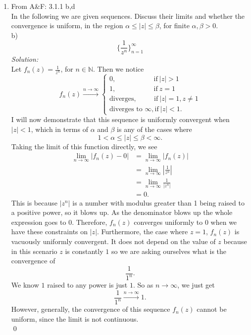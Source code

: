 \documentclass[10pt]{amsart}
\theoremstyle{nonumberplain}
\begin{document}
\begin{enumerate}[label={\bf {\arabic*}:}]
\item From A\&F: 3.1.1 b,d \\
In the following we are given sequences.
Discuss their limits and whether the convergence is uniform, in the region $\alpha \leq |z| \leq \beta$, for finite $\alpha, \beta > 0$. \\
b) $$ \bigg\{ \frac 1 {z^n} \bigg\}_{n=1}^{\infty} $$
\textit{Solution:}\\
Let $f_n(z) = \frac 1 {z^n}$, for $n \in \mathbb N$. Then we notice
$$
f_n(z) \overset{n \to \infty}{\longrightarrow} \begin{cases}
0, \quad \quad \quad \quad \quad \: \: \text{if}\: |z| > 1 \\
1, \quad \quad \quad \quad \quad \: \: \text{if}\: z = 1 \\
\text{diverges}, \quad \quad \: \: \text{if}\: |z| = 1, z \neq 1 \\
\text{diverges to } \infty, \text{if}\: |z| < 1.
\end{cases}
$$
I will now demonstrate that this sequence is uniformly convergent when $|z| < 1$, which in terms of $\alpha$ and $\beta$ is any of the cases where
$$1 <\alpha \leq |z| \leq \beta < \infty.$$
Taking the limit of this function directly, we see
\begin{align*}
\lim_{n\rightarrow \infty} \left| f_n(z) - 0 \right|
	&= \lim_{n\rightarrow \infty} \left| f_n(z)\right| \\
	&= \lim_{n\rightarrow \infty} \left| \frac 1 {z^n} \right| \\
	&= \lim_{n\rightarrow \infty} \frac 1 {\left| {z^n} \right|} \\
	&= 0.
\end{align*}
This is because $|z^n|$ is a number with modulus greater than 1 being raised to a positive power, so it blows up.
As the denominator blows up the whole expression goes to 0.
Therefore, $f_n(z)$ converges uniformly to $0$ when we have these constraints on $|z|$.
Furthermore, the case where $z = 1$, $f_n(z)$ is vacuously uniformly convergent. It does not depend on the value of $z$ because in this scenario $z$ is constantly $1$ so we are asking ourselves what is the convergence of
$$\frac 1 {1^n}.$$
We know $1$ raised to any power is just $1$. So as $n \rightarrow \infty$, we just get
$$ \frac 1 {1^n} \overset{n \to \infty}{\longrightarrow} 1.$$
However, generally, the convergence of this sequence $f_n(z)$ cannot be uniform, since the limit is not continuous. \\
\qed \\


\end{enumerate}
\end{document}
